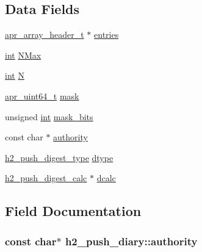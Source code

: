 \subsection*{Data Fields}
\begin{DoxyCompactItemize}
\item 
\hyperlink{structapr__array__header__t}{apr\+\_\+array\+\_\+header\+\_\+t} $\ast$ \hyperlink{structh2__push__diary_a9bc1418c2ec0e8ab5cfc58decd178087}{entries}
\item 
\hyperlink{pcre_8txt_a42dfa4ff673c82d8efe7144098fbc198}{int} \hyperlink{structh2__push__diary_a8c37e39d0dbd632c4767198974c5d20e}{N\+Max}
\item 
\hyperlink{pcre_8txt_a42dfa4ff673c82d8efe7144098fbc198}{int} \hyperlink{structh2__push__diary_a2e2734c51d3a9b23e2b01f509970ce80}{N}
\item 
\hyperlink{group__apr__platform_ga722b277a42230f3fd41cb5be7a76cfb4}{apr\+\_\+uint64\+\_\+t} \hyperlink{structh2__push__diary_a6d24b76dcaf33c161953f5ad732989a4}{mask}
\item 
unsigned \hyperlink{pcre_8txt_a42dfa4ff673c82d8efe7144098fbc198}{int} \hyperlink{structh2__push__diary_a3c7dfc74de2c5b21b4bfd6585e77469f}{mask\+\_\+bits}
\item 
const char $\ast$ \hyperlink{structh2__push__diary_ac593a2e68c7e68137e2ccf4dc82fc7f7}{authority}
\item 
\hyperlink{h2__push_8h_a6bc44d699c1575f95d1a25884f154b9d}{h2\+\_\+push\+\_\+digest\+\_\+type} \hyperlink{structh2__push__diary_a218b16e866e89cb56d388f50622246a1}{dtype}
\item 
\hyperlink{h2__push_8h_addb5514fbdb60cf770b95ff27340698b}{h2\+\_\+push\+\_\+digest\+\_\+calc} $\ast$ \hyperlink{structh2__push__diary_a7275c978e03fca52dbe0077bbb55ed27}{dcalc}
\end{DoxyCompactItemize}


\subsection{Field Documentation}
\subsubsection[{\texorpdfstring{authority}{authority}}]{\setlength{\rightskip}{0pt plus 5cm}const char$\ast$ h2\+\_\+push\+\_\+diary\+::authority}\hypertarget{structh2__push__diary_ac593a2e68c7e68137e2ccf4dc82fc7f7}{}\label{structh2__push__diary_ac593a2e68c7e68137e2ccf4dc82fc7f7}
